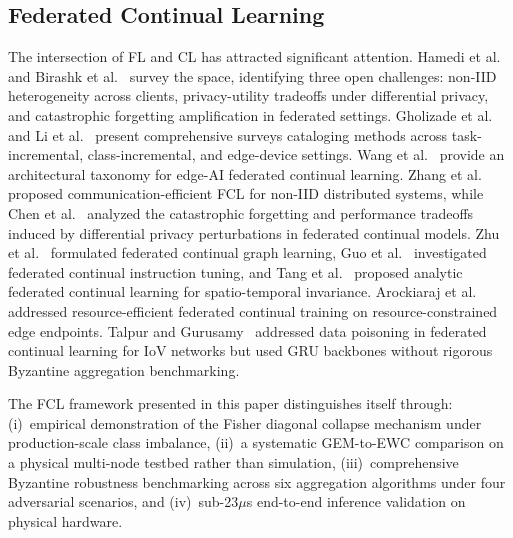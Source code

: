 \documentclass[journal,10pt,twocolumn]{IEEEtran}
\begin{document}
\subsection{Federated Continual Learning}
The intersection of FL and CL has attracted significant attention. Hamedi et al.~\cite{hamedi2025federated} and Birashk et al.~\cite{birashk2025federated} survey the space, identifying three open challenges: non-IID heterogeneity across clients, privacy-utility tradeoffs under differential privacy, and catastrophic forgetting amplification in federated settings. Gholizade et al.~\cite{gholizade2026federated} and Li et al.~\cite{li2024unleashing} present comprehensive surveys cataloging methods across task-incremental, class-incremental, and edge-device settings. Wang et al.~\cite{wang2024federated} provide an architectural taxonomy for edge-AI federated continual learning. Zhang et al.~\cite{zhang2023communication} proposed communication-efficient FCL for non-IID distributed systems, while Chen et al.~\cite{chen2024evaluating} analyzed the catastrophic forgetting and performance tradeoffs induced by differential privacy perturbations in federated continual models. Zhu et al.~\cite{zhu2025federated} formulated federated continual graph learning, Guo et al.~\cite{guo2025federated} investigated federated continual instruction tuning, and Tang et al.~\cite{tang2025afcl} proposed analytic federated continual learning for spatio-temporal invariance. Arockiaraj et al.~\cite{arockiaraj2027accurate} addressed resource-efficient federated continual training on resource-constrained edge endpoints. Talpur and Gurusamy~\cite{talpur2022gfcl} addressed data poisoning in federated continual learning for IoV networks but used GRU backbones without rigorous Byzantine aggregation benchmarking.

The FCL framework presented in this paper distinguishes itself through: (i)~empirical demonstration of the Fisher diagonal collapse mechanism under production-scale class imbalance, (ii)~a systematic GEM-to-EWC comparison on a physical multi-node testbed rather than simulation, (iii)~comprehensive Byzantine robustness benchmarking across six aggregation algorithms under four adversarial scenarios, and (iv)~sub-23$\mu$s end-to-end inference validation on physical hardware.
\end{document}
